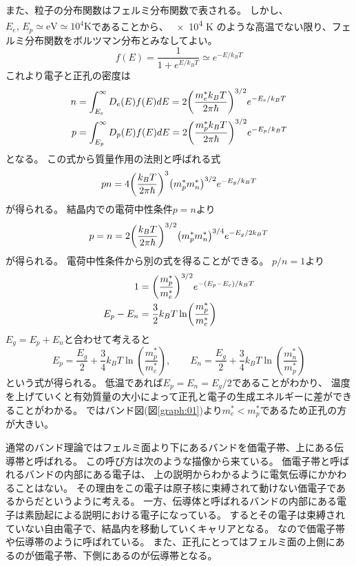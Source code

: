 \documentclass[11pt,dvipdfmx,a4paper]{jsarticle}
\numberwithin{equation}{section}
\begin{document}
また、粒子の分布関数はフェルミ分布関数で表される。
しかし、\(E_e,\, E_p \simeq \text{eV} \simeq 10^4 \text{K}\)であることから、
\num{e4} K のような高温でない限り、フェルミ分布関数をボルツマン分布とみなしてよい。
\begin{equation}
	f(E) = \frac{1}{1+e^{E/k_BT}} \simeq e^{-E/k_BT}
\end{equation}
これより電子と正孔の密度は
\begin{align}
	n &= \int_{E_e}^\infty D_e(E) f(E) dE = 2\qty(\frac{m_e^*k_BT}{2\pi\hbar})^{3/2}e^{-E_e/k_BT}\\
	p &= \int_{E_p}^\infty D_p(E) f(E) dE = 2\qty(\frac{m_p^*k_BT}{2\pi\hbar})^{3/2}e^{-E_p/k_BT}
\end{align}
となる。
この式から質量作用の法則と呼ばれる式
\begin{equation}
	pn = 4\qty(\frac{k_B T}{2\pi\hbar})^3\qty(m_p^*m_n^*)^{3/2} e^{-E_g/k_BT}
\end{equation}
が得られる。
結晶内での電荷中性条件\(p=n\)より
\begin{equation}
	p=n=2\qty(\frac{k_B T}{2\pi\hbar})^{3/2}\qty(m_p^*m_n^*)^{3/4} e^{-E_g/2k_BT}
\end{equation}
が得られる。
電荷中性条件から別の式を得ることができる。
\(p/n=1\)より
\begin{align}
	1 &= \qty(\frac{m_p^*}{m_e^*})^{3/2}e^{-(E_p-E_c)/k_BT}\\
	E_p - E_n &= \frac{3}{2}k_BT\ln(\frac{m_p^*}{m_e^*})
\end{align}
\(E_g = E_p + E_n\)と合わせて考えると
\begin{equation}
	E_p = \frac{E_g}{2} + \frac{3}{4}k_BT\ln(\frac{m_p^*}{m_e^*}), \qquad
	E_n = \frac{E_g}{2} + \frac{3}{4}k_BT\ln(\frac{m_n^*}{m_p^*})
\end{equation}
という式が得られる。
低温であれば\(E_p=E_n=E_g/2\)であることがわかり、
温度を上げていくと有効質量の大小によって正孔と電子の生成エネルギーに差ができることがわかる。
ではバンド図(図\ref{graph:01})より\(m_e^* < m_p^*\)であるため正孔の方が大きい。

通常のバンド理論ではフェルミ面より下にあるバンドを価電子帯、上にある伝導帯と呼ばれる。
この呼び方は次のような描像から来ている。
価電子帯と呼ばれるバンドの内部にある電子は、
上の説明からわかるように電気伝導にかかわることはない。
その理由をこの電子は原子核に束縛されて動けない価電子であるからだというように考える。
一方、伝導体と呼ばれるバンドの内部にある電子は素励起による説明における電子になっている。
するとその電子は束縛されていない自由電子で、結晶内を移動していくキャリアとなる。
なので価電子帯や伝導帯のように呼ばれている。
また、正孔にとってはフェルミ面の上側にあるのが価電子帯、下側にあるのが伝導帯となる。
\end{document}
